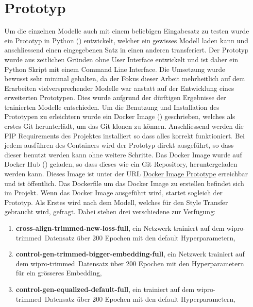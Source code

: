 \section{Prototyp}
\label{sec:prototyp}
Um die einzelnen Modelle auch mit einem beliebigen Eingabesatz zu testen wurde ein Prototyp in Python (\cite{python})
entwickelt, welcher ein gewisses Modell laden kann und anschliessend einen eingegebenen Satz in einen anderen
transferiert.
\newline
\newline
Der Prototyp wurde aus zeitlichen Gründen ohne User Interface entwickelt und ist daher ein Python Skript mit einem
Command Line Interface. Die Umsetzung wurde bewusst sehr minimal gehalten, da der Fokus dieser Arbeit mehrheitlich auf
dem Erarbeiten vielversprechender Modelle war anstatt auf der Entwicklung eines erweiterten Prototypen. Dies wurde
aufgrund der dürftigen Ergebnisse der trainierten Modelle entschieden.
\newline
\newline
Um die Benutzung und Installation des Prototypen zu erleichtern wurde ein Docker Image (\cite{docker}) geschrieben,
welches als erstes Git herunterlädt, um das  Git klonen zu können. Anschliessend werden die
PIP Requirements des Projektes installiert so dass alles korrekt funktioniert. Bei jedem ausführen des Containers wird
der Prototyp direkt ausgeführt, so dass dieser benutzt werden kann ohne weitere Schritte. Das Docker Image wurde auf
Docker Hub (\cite{docker_hub}) geladen, so dass dieses wie ein Git Repository, heruntergeladen werden kann. Dieses Image
ist unter der URL \hyperlink{https://hub.docker.com/repository/docker/fabiangroeger96/wipro-prototype}{Docker Image
Prototype} erreichbar und ist öffentlich. Das Dockerfile um das Docker Image zu erstellen befindet sich im
 Projekt.
\newline
\newline
Wenn das Docker Image ausgeführt wird, startet sogleich der Prototyp. Als Erstes wird nach dem Modell, welches für den
Style Transfer gebraucht wird, gefragt. Dabei stehen drei verschiedene zur Verfügung:
\begin{enumerate}
  \setlength\itemsep{0em}
  \item \textbf{cross-align-trimmed-new-loss-full}, ein  Netzwerk trainiert auf dem \flqq
  wipro-trimmed\frqq \ Datensatz über 200 Epochen mit den default Hyperparametern, 
  \item \textbf{control-gen-trimmed-bigger-embedding-full}, ein  Netzwerk trainiert auf dem \flqq
  wipro-trimmed\frqq \ Datensatz über 200 Epochen mit den Hyperparametern für ein grösseres Embedding,
  \item \textbf{control-gen-equalized-default-full}, ein  trainiert auf dem \flqq
  wipro-trimmed\frqq \ Datensatz über 200 Epochen mit den default Hyperparametern, 
\end{enumerate}
